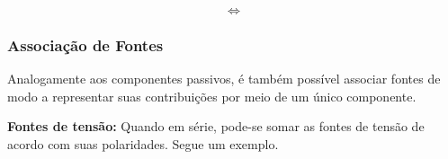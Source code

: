 \documentclass{article}
\numberwithin{equation}{section}
\newlength\Colsep
\begin{document}
\noindent\begin{minipage}{\textwidth}
\begin{minipage}[c][3cm][c]{\dimexpr0.45\textwidth-0.5\Colsep\relax}
    \begin{center}
    \end{center}
\end{minipage} \hfill
\begin{minipage}[c][3cm][c]{\dimexpr0.1\textwidth-0.5\Colsep\relax}
    $$\iff$$
\end{minipage} \hfill
\begin{minipage}[c][3cm][c]{\dimexpr0.45\textwidth-0.5\Colsep\relax}
    \begin{center}
    \end{center}
\end{minipage}
\end{minipage}

\subsubsection{Associação de Fontes}
\label{subsubsec:assocfonte}

Analogamente aos componentes passivos, é também possível associar fontes de modo a representar suas contribuições por meio de um único componente.

\vspace{4mm}

\textbf{\small{\textbullet} Fontes de tensão:} Quando em série, pode-se somar as fontes de tensão de acordo com suas polaridades. Segue um exemplo.
\end{document}

